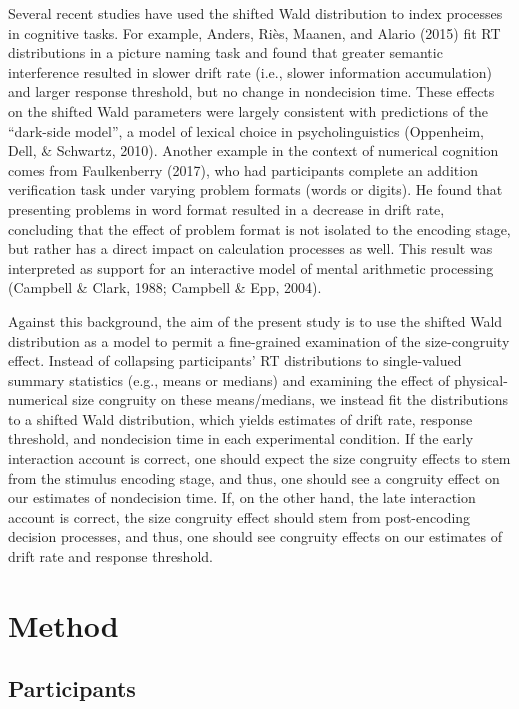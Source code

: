 \documentclass[english,,man]{apa6}
\theoremstyle{definition}
\theoremstyle{definition}
\theoremstyle{definition}
\theoremstyle{remark}
\begin{document}
Several recent studies have used the shifted Wald distribution to index
processes in cognitive tasks. For example, Anders, Riès, Maanen, and
Alario (2015) fit RT distributions in a picture naming task and found
that greater semantic interference resulted in slower drift rate (i.e.,
slower information accumulation) and larger response threshold, but no
change in nondecision time. These effects on the shifted Wald parameters
were largely consistent with predictions of the \enquote{dark-side
model}, a model of lexical choice in psycholinguistics (Oppenheim, Dell,
\& Schwartz, 2010). Another example in the context of numerical
cognition comes from Faulkenberry (2017), who had participants complete
an addition verification task under varying problem formats (words or
digits). He found that presenting problems in word format resulted in a
decrease in drift rate, concluding that the effect of problem format is
not isolated to the encoding stage, but rather has a direct impact on
calculation processes as well. This result was interpreted as support
for an interactive model of mental arithmetic processing (Campbell \&
Clark, 1988; Campbell \& Epp, 2004).

Against this background, the aim of the present study is to use the
shifted Wald distribution as a model to permit a fine-grained
examination of the size-congruity effect. Instead of collapsing
participants' RT distributions to single-valued summary statistics
(e.g., means or medians) and examining the effect of physical-numerical
size congruity on these means/medians, we instead fit the distributions
to a shifted Wald distribution, which yields estimates of drift rate,
response threshold, and nondecision time in each experimental condition.
If the early interaction account is correct, one should expect the size
congruity effects to stem from the stimulus encoding stage, and thus,
one should see a congruity effect on our estimates of nondecision time.
If, on the other hand, the late interaction account is correct, the size
congruity effect should stem from post-encoding decision processes, and
thus, one should see congruity effects on our estimates of drift rate
and response threshold.

\hypertarget{method}{%
\section{Method}\label{method}}

\hypertarget{participants}{%
\subsection{Participants}\label{participants}}
\end{document}
